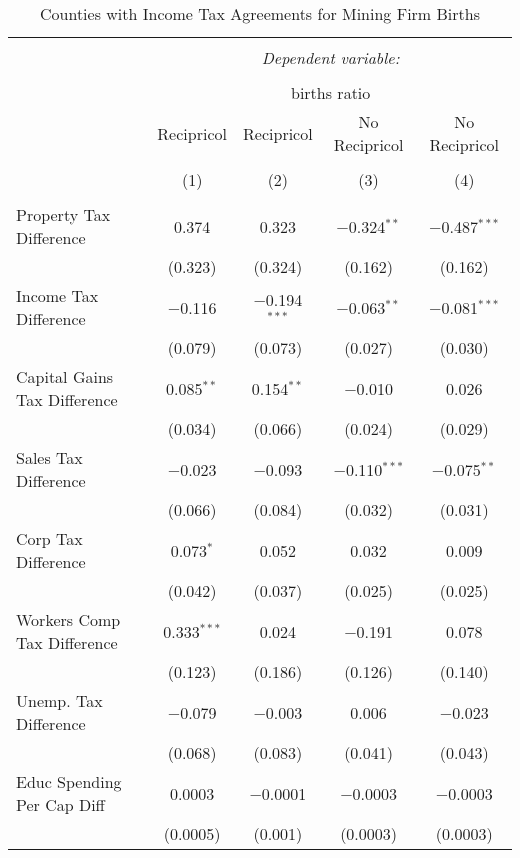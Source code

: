 
\begin{table}[!htbp] \centering 
  \caption{Counties with Income Tax Agreements for  Mining Firm Births} 
  \label{21rd} 
\begin{tabular}{@{\extracolsep{5pt}}lcccc} 
\\[-1.8ex]\hline 
\hline \\[-1.8ex] 
 & \multicolumn{4}{c}{\textit{Dependent variable:}} \\ 
\cline{2-5} 
\\[-1.8ex] & \multicolumn{4}{c}{births ratio} \\ 
 & Recipricol & Recipricol & No Recipricol & No Recipricol \\ 
\\[-1.8ex] & (1) & (2) & (3) & (4)\\ 
\hline \\[-1.8ex] 
 Property Tax Difference & 0.374 & 0.323 & $-$0.324$^{**}$ & $-$0.487$^{***}$ \\ 
  & (0.323) & (0.324) & (0.162) & (0.162) \\ 
  Income Tax Difference & $-$0.116 & $-$0.194$^{***}$ & $-$0.063$^{**}$ & $-$0.081$^{***}$ \\ 
  & (0.079) & (0.073) & (0.027) & (0.030) \\ 
  Capital Gains Tax Difference & 0.085$^{**}$ & 0.154$^{**}$ & $-$0.010 & 0.026 \\ 
  & (0.034) & (0.066) & (0.024) & (0.029) \\ 
  Sales Tax Difference & $-$0.023 & $-$0.093 & $-$0.110$^{***}$ & $-$0.075$^{**}$ \\ 
  & (0.066) & (0.084) & (0.032) & (0.031) \\ 
  Corp Tax Difference & 0.073$^{*}$ & 0.052 & 0.032 & 0.009 \\ 
  & (0.042) & (0.037) & (0.025) & (0.025) \\ 
  Workers Comp Tax Difference & 0.333$^{***}$ & 0.024 & $-$0.191 & 0.078 \\ 
  & (0.123) & (0.186) & (0.126) & (0.140) \\ 
  Unemp. Tax Difference & $-$0.079 & $-$0.003 & 0.006 & $-$0.023 \\ 
  & (0.068) & (0.083) & (0.041) & (0.043) \\ 
  Educ Spending Per Cap Diff & 0.0003 & $-$0.0001 & $-$0.0003 & $-$0.0003 \\ 
  & (0.0005) & (0.001) & (0.0003) & (0.0003) \\ 

\end{tabular}
\end{table}
